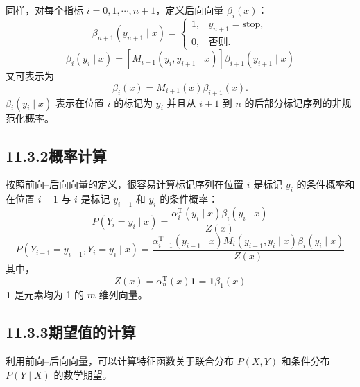 \documentclass[UTF8, 12pt, fontset=fandol, oneside]{ctexart}
\begin{document}
同样，对每个指标 $i=0,1,\cdots,n+1$，定义后向向量 $\beta_i(x)$：
\begin{equation}
\beta_{n+1}(y_{n+1}\mid x)=
\begin{cases}
1, & y_{n+1}=\text{stop},\\
0, & \text{否则}.
\end{cases}
\tag{11.29}
\end{equation}
\begin{equation}
\beta_i(y_i\mid x)=[M_{i+1}(y_i,y_{i+1}\mid x)]\beta_{i+1}(y_{i+1}\mid x)
\tag{11.30}
\end{equation}
又可表示为
\begin{equation}
\beta_i(x)=M_{i+1}(x)\beta_{i+1}(x).
\tag{11.31}
\end{equation}
$\beta_i(y_i\mid x)$ 表示在位置 $i$ 的标记为 $y_i$ 并且从 $i+1$ 到 $n$ 的后部分标记序列的非规范化概率。

\subsection*{11.3.2\quad 概率计算}

按照前向--后向向量的定义，很容易计算标记序列在位置 $i$ 是标记 $y_i$ 的条件概率和在位置 $i-1$ 与 $i$ 是标记 $y_{i-1}$ 和 $y_i$ 的条件概率：
\begin{equation}
P(Y_i=y_i\mid x)=\frac{\alpha_i^{\mathrm T}(y_i\mid x)\beta_i(y_i\mid x)}{Z(x)}
\tag{11.32}
\end{equation}
\begin{equation}
P(Y_{i-1}=y_{i-1},Y_i=y_i\mid x)=
\frac{\alpha_{i-1}^{\mathrm T}(y_{i-1}\mid x)M_i(y_{i-1},y_i\mid x)\beta_i(y_i\mid x)}{Z(x)}
\tag{11.33}
\end{equation}
其中，
\[
Z(x)=\alpha_n^{\mathrm T}(x)\mathbf{1}=\mathbf{1}\beta_1(x)
\]
$\mathbf{1}$ 是元素均为 1 的 $m$ 维列向量。

\subsection*{11.3.3\quad 期望值的计算}

利用前向--后向向量，可以计算特征函数关于联合分布 $P(X,Y)$ 和条件分布 $P(Y\mid X)$ 的数学期望。
\end{document}

